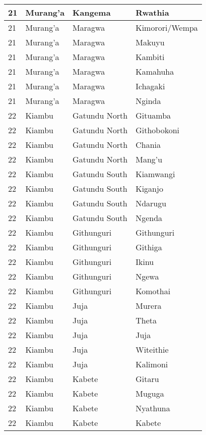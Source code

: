 \begin{table}[!ht]
\begin{tabular}{|l|l|l|l|}
        21 & Murang’a & Kangema & Rwathia \\ \hline
        21 & Murang’a & Maragwa & Kimorori/Wempa \\ \hline
        21 & Murang’a & Maragwa & Makuyu \\ \hline
        21 & Murang’a & Maragwa & Kambiti \\ \hline
        21 & Murang’a & Maragwa & Kamahuha \\ \hline
        21 & Murang’a & Maragwa & Ichagaki \\ \hline
        21 & Murang’a & Maragwa & Nginda \\ \hline
        22 & Kiambu & Gatundu North & Gituamba \\ \hline
        22 & Kiambu & Gatundu North & Githobokoni \\ \hline
        22 & Kiambu & Gatundu North & Chania \\ \hline
        22 & Kiambu & Gatundu North & Mang’u \\ \hline
        22 & Kiambu & Gatundu South & Kiamwangi \\ \hline
        22 & Kiambu & Gatundu South & Kiganjo \\ \hline
        22 & Kiambu & Gatundu South & Ndarugu \\ \hline
        22 & Kiambu & Gatundu South & Ngenda \\ \hline
        22 & Kiambu & Githunguri & Githunguri \\ \hline
        22 & Kiambu & Githunguri & Githiga \\ \hline
        22 & Kiambu & Githunguri & Ikinu \\ \hline
        22 & Kiambu & Githunguri & Ngewa \\ \hline
        22 & Kiambu & Githunguri & Komothai \\ \hline
        22 & Kiambu & Juja & Murera \\ \hline
        22 & Kiambu & Juja & Theta \\ \hline
        22 & Kiambu & Juja & Juja \\ \hline
        22 & Kiambu & Juja & Witeithie \\ \hline
        22 & Kiambu & Juja & Kalimoni \\ \hline
        22 & Kiambu & Kabete & Gitaru \\ \hline
        22 & Kiambu & Kabete & Muguga \\ \hline
        22 & Kiambu & Kabete & Nyathuna \\ \hline
        22 & Kiambu & Kabete & Kabete \\ \hline

\end{tabular}
\end{table}
